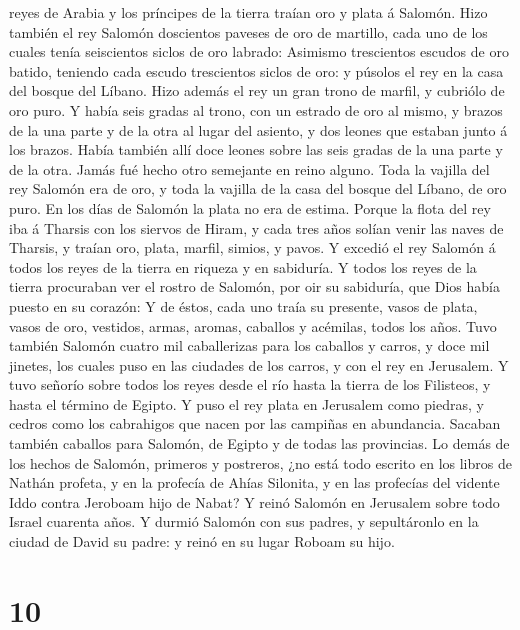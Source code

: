 reyes de Arabia y los príncipes de la tierra traían oro y plata á
Salomón.  Hizo también el rey Salomón doscientos paveses
de oro de martillo, cada uno de los cuales tenía seiscientos siclos de
oro labrado:  Asimismo trescientos escudos de oro batido,
teniendo cada escudo trescientos siclos de oro: y púsolos el rey en la
casa del bosque del Líbano.  Hizo además el rey un gran
trono de marfil, y cubriólo de oro puro.  Y había seis
gradas al trono, con un estrado de oro al mismo, y brazos de la una
parte y de la otra al lugar del asiento, y dos leones que estaban junto
á los brazos.  Había también allí doce leones sobre las
seis gradas de la una parte y de la otra. Jamás fué hecho otro semejante
en reino alguno.  Toda la vajilla del rey Salomón era de
oro, y toda la vajilla de la casa del bosque del Líbano, de oro puro. En
los días de Salomón la plata no era de estima.  Porque la
flota del rey iba á Tharsis con los siervos de Hiram, y cada tres años
solían venir las naves de Tharsis, y traían oro, plata, marfil, simios,
y pavos.  Y excedió el rey Salomón á todos los reyes de
la tierra en riqueza y en sabiduría.  Y todos los reyes
de la tierra procuraban ver el rostro de Salomón, por oir su sabiduría,
que Dios había puesto en su corazón:  Y de éstos, cada
uno traía su presente, vasos de plata, vasos de oro, vestidos, armas,
aromas, caballos y acémilas, todos los años.  Tuvo
también Salomón cuatro mil caballerizas para los caballos y carros, y
doce mil jinetes, los cuales puso en las ciudades de los carros, y con
el rey en Jerusalem.  Y tuvo señorío sobre todos los
reyes desde el río hasta la tierra de los Filisteos, y hasta el término
de Egipto.  Y puso el rey plata en Jerusalem como
piedras, y cedros como los cabrahigos que nacen por las campiñas en
abundancia.  Sacaban también caballos para Salomón, de
Egipto y de todas las provincias.  Lo demás de los hechos
de Salomón, primeros y postreros, ¿no está todo escrito en los libros de
Nathán profeta, y en la profecía de Ahías Silonita, y en las profecías
del vidente Iddo contra Jeroboam hijo de Nabat?  Y reinó
Salomón en Jerusalem sobre todo Israel cuarenta años.  Y
durmió Salomón con sus padres, y sepultáronlo en la ciudad de David su
padre: y reinó en su lugar Roboam su hijo.

\hypertarget{section-9}{%
\section{10}\label{section-9}}

